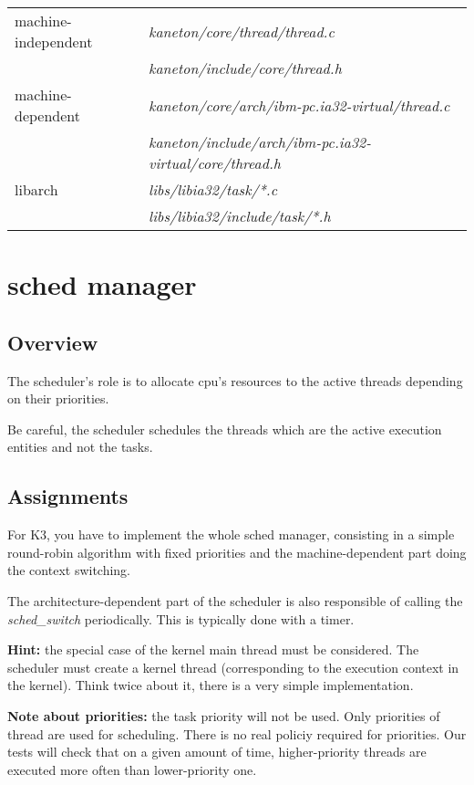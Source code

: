 \begin{tabular}{| l | l |}
  \hline
  machine-independent & {\em kaneton/core/thread/thread.c}\\
  &  {\em kaneton/include/core/thread.h}\\\hline
  machine-dependent & {\em kaneton/core/arch/ibm-pc.ia32-virtual/thread.c}\\
  & {\em kaneton/include/arch/ibm-pc.ia32-virtual/core/thread.h}\\\hline
  libarch & {\em libs/libia32/task/*.c}\\
  &  {\em libs/libia32/include/task/*.h}\\\hline
\end{tabular}


%
%

\newpage

\section{\textbf{sched} manager}
\subsection*{Overview}

The scheduler's role is to allocate cpu's resources to the
active threads depending on their priorities.

Be careful, the scheduler schedules the threads which are the active
execution entities and not the tasks.

\subsection*{Assignments}

For K3, you have to implement the whole sched manager, consisting
in a simple round-robin algorithm with fixed priorities and the
machine-dependent part doing the context switching.

The architecture-dependent part of the scheduler is also
responsible of calling the \emph{sched\_switch} periodically. This
is typically done with a timer.

\textbf{Hint:} the special case of the kernel main thread must be
considered. The scheduler must create a kernel thread
(corresponding to the execution context in the kernel). Think
twice about it, there is a very simple implementation.

\textbf{Note about priorities:} the task priority will not be
used. Only priorities of thread are used for scheduling. There is
no real policiy required for priorities. Our tests will check that
on a given amount of time, higher-priority threads are executed
more often than lower-priority one.

